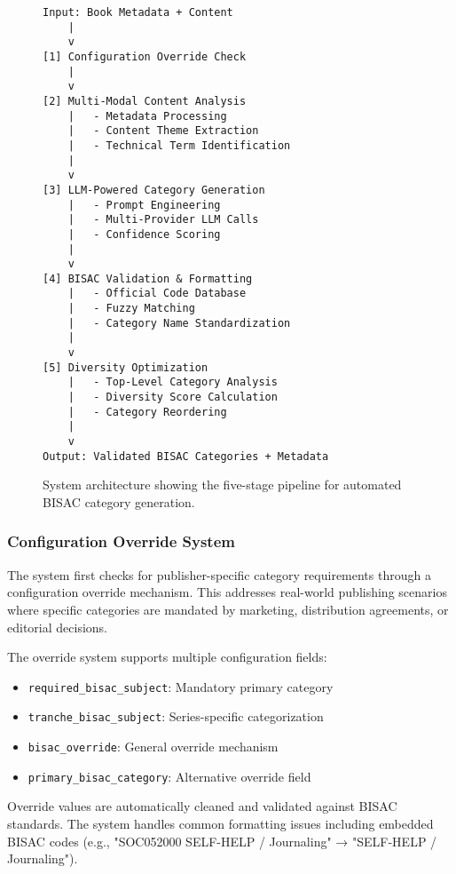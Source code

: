 \documentclass{article}
\begin{document}
\begin{figure}[ht]
\centering
\begin{minipage}{0.8\textwidth}
\begin{lstlisting}[language=text, caption=System Architecture Overview]
Input: Book Metadata + Content
    |
    v
[1] Configuration Override Check
    |
    v
[2] Multi-Modal Content Analysis
    |   - Metadata Processing
    |   - Content Theme Extraction
    |   - Technical Term Identification
    |
    v
[3] LLM-Powered Category Generation
    |   - Prompt Engineering
    |   - Multi-Provider LLM Calls
    |   - Confidence Scoring
    |
    v
[4] BISAC Validation & Formatting
    |   - Official Code Database
    |   - Fuzzy Matching
    |   - Category Name Standardization
    |
    v
[5] Diversity Optimization
    |   - Top-Level Category Analysis
    |   - Diversity Score Calculation
    |   - Category Reordering
    |
    v
Output: Validated BISAC Categories + Metadata
\end{lstlisting}
\end{minipage}
\caption{System architecture showing the five-stage pipeline for automated BISAC category generation.}
\label{fig:architecture}
\end{figure}

\subsubsection{Configuration Override System}

The system first checks for publisher-specific category requirements through a configuration override mechanism. This addresses real-world publishing scenarios where specific categories are mandated by marketing, distribution agreements, or editorial decisions.

The override system supports multiple configuration fields:
\begin{itemize}
\item \texttt{required\_bisac\_subject}: Mandatory primary category
\item \texttt{tranche\_bisac\_subject}: Series-specific categorization
\item \texttt{bisac\_override}: General override mechanism
\item \texttt{primary\_bisac\_category}: Alternative override field
\end{itemize}

Override values are automatically cleaned and validated against BISAC standards. The system handles common formatting issues including embedded BISAC codes (e.g., "SOC052000 SELF-HELP / Journaling" → "SELF-HELP / Journaling").
\end{document}
